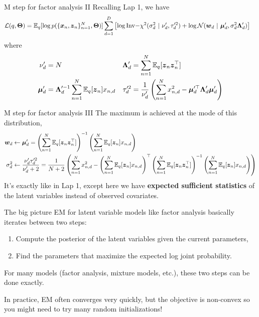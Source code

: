 \documentclass[aspectratio=169]{beamer}
\begin{document}
\begin{frame}{M step for factor analysis II}
Recalling Lap 1, we have
\begin{align}
    \mathcal{L}(q, \boldsymbol{\Theta}) &= \mathbb{E}_q[\log p(\{\boldsymbol{x}_n, \boldsymbol{z}_n\}_{n=1}^N, \boldsymbol{\Theta})]
    \sum_{d=1}^D \left[ \log \mathrm{Inv-}\chi^2(\sigma_d^2 ~\vert~ \nu_d', \tau_d'^2) + \log \mathcal{N}(\boldsymbol{w}_d ~\vert~ \boldsymbol{\mu}_d', \sigma_d^2 \boldsymbol{\Lambda}_d') \right]
\end{align}
where
\begin{align}
    \nu_d' &= N &
    \boldsymbol{\Lambda}_d' &= \sum_{n=1}^N \mathbb{E}_q[\boldsymbol{z}_n \boldsymbol{z}_n^\top] \\
    \boldsymbol{\mu}_d' &= \boldsymbol{\Lambda}_d'^{-1} \sum_{n=1}^N \mathbb{E}_q[\boldsymbol{z}_n] x_{n,d} &
    \tau_d'^2 &= \frac{1}{\nu_d'} \left( \sum_{n=1}^N x_{n,d}^2 - \boldsymbol{\mu}_d'^\top  \boldsymbol{\Lambda}_d' \boldsymbol{\mu}_d' \right)
\end{align}
\end{frame}

\begin{frame}{M step for factor analysis III}
The maximum is achieved at the mode of this distribution,
\begin{align}
    \boldsymbol{w}_d &\leftarrow \boldsymbol{\mu}_d' = \left( \sum_{n=1}^N \mathbb{E}_q[\boldsymbol{z}_n \boldsymbol{z}_n^\top] \right)^{-1} \left( \sum_{n=1}^N \mathbb{E}_q[\boldsymbol{z}_n] x_{n,d} \right) \\
    \sigma_d^2 &\leftarrow \frac{\nu_d' \tau_d'^2}{\nu_d' + 2}  = \frac{1}{N+2} \left(\sum_{n=1}^N x_{n,d}^2 - \left( \sum_{n=1}^N \mathbb{E}_q[\boldsymbol{z}_n] x_{n,d} \right)^\top \left( \sum_{n=1}^N \mathbb{E}_q[\boldsymbol{z}_n \boldsymbol{z}_n^\top] \right)^{-1} \left( \sum_{n=1}^N \mathbb{E}_q[\boldsymbol{z}_n] x_{n,d} \right) \right)
\end{align}
It's exactly like in Lap 1, except here we have \textbf{expected sufficient statistics} of the latent variables instead of observed covariates.
\end{frame}

\begin{frame}{The big picture}
EM for latent variable models like factor analysis basically iterates between two steps:
\begin{enumerate}
    \item Compute the posterior of the latent variables given the current parameters,
    \item Find the parameters that maximize the expected log joint probability.
\end{enumerate}

For many models (factor analysis, mixture models, etc.), these two steps can be done exactly. 

In practice, EM often converges very quickly, but the objective is non-convex so you might need to try many random initializations!

\end{frame}
\end{document}
